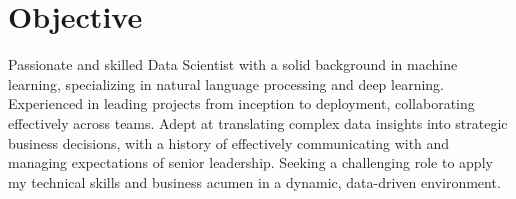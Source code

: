 \section{Objective}
Passionate and skilled Data Scientist with a solid background in machine learning, specializing in natural language processing and deep learning. Experienced in leading projects from inception to deployment, collaborating effectively across teams. Adept at translating complex data insights into strategic business decisions, with a history of effectively communicating with and managing expectations of senior leadership. Seeking a challenging role to apply my technical skills and business acumen in a dynamic, data-driven environment.

